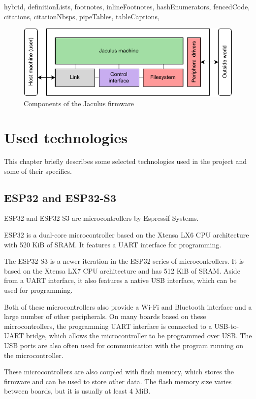 \begin{markdown*}{%
  hybrid,
  definitionLists,
  footnotes,
  inlineFootnotes,
  hashEnumerators,
  fencedCode,
  citations,
  citationNbsps,
  pipeTables,
  tableCaptions,
}
\begin{figure}[!ht]
  \centering
  \includegraphics[width=\textwidth]{img/jaculus-design}
  \caption{Components of the Jaculus firmware}
  \label{fig:jaculus-design}
\end{figure}


\chapter{Used technologies}

This chapter briefly describes some selected technologies used in the project and some of their specifics.

\section{ESP32 and ESP32-S3}

ESP32 and ESP32-S3 are microcontrollers by Espressif Systems.

ESP32 is a dual-core microcontroller based on the Xtensa LX6 CPU architecture with 520 KiB of SRAM. It features a UART interface for programming.

The ESP32-S3 is a newer iteration in the ESP32 series of microcontrollers. It is based on the Xtensa LX7 CPU architecture and has 512 KiB of SRAM. Aside from a UART interface, it also features a native USB interface, which can be used for programming.

Both of these microcontrollers also provide a Wi-Fi and Bluetooth interface and a large number of other peripherals. On many boards based on these microcontrollers, the programming UART interface is connected to a USB-to-UART bridge, which allows the microcontroller to be programmed over USB. The USB ports are also often used for communication with the program running on the microcontroller.

These microcontrollers are also coupled with flash memory, which stores the firmware and can be used to store other data. The flash memory size varies between boards, but it is usually at least 4 MiB.


\end{markdown*}
